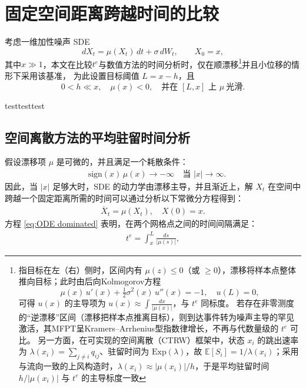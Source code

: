 	
	\newpage
	
\section{固定空间距离跨越时间的比较}



考虑一维加性噪声 SDE
\begin{equation}\label{eq:sde-time-mfpt}
	dX_t=\mu(X_t)\,dt+\sigma\,dW_t,\qquad X_0=x,
\end{equation}
其中$x\gg 1$，本文在比较$t^e$与数值方法的时间分析时，仅在顺漂移\footnote{指目标在左（右）侧时，区间内有 $\mu(z)\le0$（或 $\ge0$），漂移将样本点整体推向目标；此时由后向Kolmogorov方程
	\[
	\mu(x)\,u'(x)+\tfrac12\sigma^2(x)\,u''(x)=-1,\quad u(L)=0,
	\]
可得 $u(x)$ 的主导项为 $u(x)\approx\int\frac{dx}{|\mu(x)|}$，与 $t^e$ 同标度。 若存在非零测度的“逆漂移”区间（漂移把样本点推离目标），则到达事件转为噪声主导的罕见激活，其MFPT呈Kramers–Arrhenius型指数律增长，不再与代数量级的 $t^e$ 可比\cite{Hanggi1990ReactionRateKramers}。 另一方面，在可实现的空间离散（CTRW）框架中，状态 $x_i$ 的跳出速率为 $\lambda(x_i)=\sum_{j\ne i}q_{ij}$、驻留时间为 $\mathrm{Exp}(\lambda)$，故 $\mathbb E[S_i]=1/\lambda(x_i)$；采用与流向一致的上风构造时，$\lambda(x_i)\approx|\mu(x_i)|/h$，于是平均驻留时间 $h/|\mu(x_i)|$ 与 $t^e$ 的主导标度一致\cite{bou2018continuous}}并且小位移的情形下采用该基准，%
为此设置目标阈值 $L=x-h$，且
\begin{equation}\label{eq:assum-local}
	0< h \ll x,\quad \mu(x)<0,\quad \text{并在 }[L,x]\text{ 上 }\mu\ \text{光滑}.
\end{equation}


testtesttest

\subsection{空间离散方法的平均驻留时间分析}
假设漂移项 $\mu$ 是可微的，并且满足一个耗散条件：
\begin{align}
	\quad \text{sign}(x)\,\mu(x) \to -\infty \quad \text{当 } |x|\to\infty.
\end{align}
因此，当 $|x|$ 足够大时，SDE 的动力学由漂移主导，并且渐近上，解 $X_t$ 在空间中跨越一个固定距离所需的时间可以通过分析以下常微分方程得到：
\begin{align} \label{eq:ODE dominated}
	\dot{X_t} = \mu(X_t), \quad X(0)=x.
\end{align}
方程 \eqref{eq:ODE dominated} 表明，在两个网格点之间的时间间隔满足：
\begin{align}\label{eq:te-def}
	t^e = \int_{x}^{L} \frac{ds}{|\mu(s)|}, 
\end{align}

